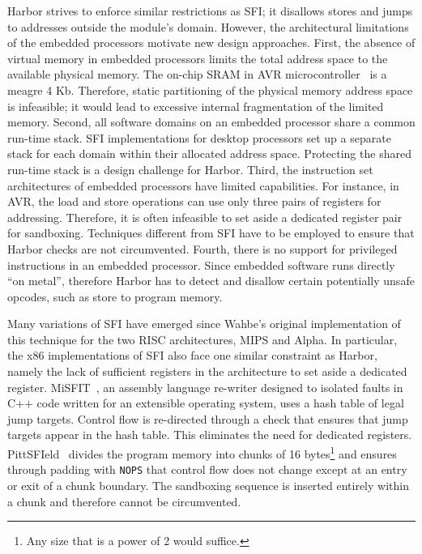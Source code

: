 Harbor strives to enforce similar restrictions as SFI; it disallows
stores and jumps to addresses outside the module's domain.
%
However, the architectural limitations of the embedded processors
motivate new design approaches.
%
First, the absence of virtual memory in embedded processors limits the
total address space to the available physical memory.
%
The on-chip SRAM in AVR microcontroller~\cite{avrdatasheet} is a meagre 4 Kb.
%
Therefore, static partitioning of the physical memory address space is
infeasible; it would lead to excessive internal fragmentation of the
limited memory.
%
Second, all software domains on an embedded processor share a
common run-time stack.
%
SFI implementations for desktop processors set up a separate stack for
each domain within their allocated address space.
%
Protecting the shared run-time stack is a design challenge for Harbor.
%
Third, the instruction set architectures of embedded processors have
limited capabilities.
%
For instance, in AVR, the load and store operations can use only three
pairs of registers for addressing.
%
Therefore, it is often infeasible to set aside a dedicated register
pair for sandboxing.
%
Techniques different from SFI have to be employed to ensure that
Harbor checks are not circumvented.
%
Fourth, there is no support for privileged instructions in an embedded
processor.
%
Since embedded software runs directly ``on metal'', therefore Harbor
has to detect and disallow certain potentially unsafe opcodes, such
as store to program memory.
%


Many variations of SFI have emerged since Wahbe's original
implementation of this technique for the two RISC architectures, MIPS
and Alpha.
%
In particular, the x86 implementations of SFI also face one similar
constraint as Harbor, namely the lack of sufficient registers in the
architecture to set aside a dedicated register.
%
MiSFIT~\cite{small97misfit}, an assembly language re-writer designed
to isolated faults in C++ code written for an extensible operating
system, uses a hash table of legal jump targets.
%
Control flow is re-directed through a check that ensures that jump
targets appear in the hash table.
%
This eliminates the need for dedicated registers.
%
PittSFIeld~\cite{pittsfield} divides the program memory into chunks of
16 bytes\footnote{Any size that is a power of 2 would suffice.} and
ensures through padding with \texttt{NOPS} that control flow does not
change except at an entry or exit of a chunk boundary.
%
The sandboxing sequence is inserted entirely within a chunk and
therefore cannot be circumvented.



